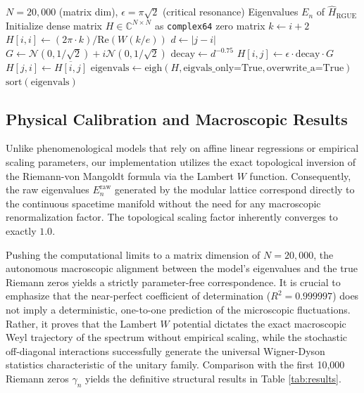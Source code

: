 \documentclass[aps,prl,preprint,superscriptaddress,floatfix]{revtex4-2}
\begin{document}
\begin{algorithm}[H]
\caption{Parameter-Free Riemann-GUE Ensemble Generation}
\label{alg:hamiltonian}
\begin{algorithmic}
\Require $N=20,000$ (matrix dim), $\epsilon=\pi\sqrt{2}$ (critical resonance)
\Ensure Eigenvalues $E_n$ of $\hat{H}_{\text{RGUE}}$
\State Initialize dense matrix $H \in \mathbb{C}^{N \times N}$ as \texttt{complex64} zero matrix
    \State $k \gets i+2$
    \State $H[i,i] \gets (2\pi \cdot k) / \text{Re}(W(k/e))$ 
        \State $d \gets |j-i|$
         
            \State $G \gets \mathcal{N}(0, 1/\sqrt{2}) + i\mathcal{N}(0, 1/\sqrt{2})$ 
            \State $\text{decay} \gets d^{-0.75}$ 
            \State $H[i,j] \gets \epsilon \cdot \text{decay} \cdot G$
            \State $H[j,i] \gets \overline{H[i,j]}$ 
        \EndIf
    \EndFor
\EndFor
\State $\text{eigenvals} \gets \text{eigh}(H, \text{eigvals\_only=True}, \text{overwrite\_a=True})$
\State \Return $\text{sort}(\text{eigenvals})$
\end{algorithmic}
\end{algorithm}

\subsection{Physical Calibration and Macroscopic Results}
Unlike phenomenological models that rely on affine linear regressions or empirical scaling parameters, our implementation utilizes the exact topological inversion of the Riemann-von Mangoldt formula via the Lambert $W$ function. Consequently, the raw eigenvalues $E_n^{\text{raw}}$ generated by the modular lattice correspond directly to the continuous spacetime manifold without the need for any macroscopic renormalization factor. The topological scaling factor inherently converges to exactly $1.0$.

Pushing the computational limits to a matrix dimension of $N=20,000$, the autonomous macroscopic alignment between the model's eigenvalues and the true Riemann zeros yields a strictly parameter-free correspondence. It is crucial to emphasize that the near-perfect coefficient of determination ($R^2 = 0.999997$) does not imply a deterministic, one-to-one prediction of the microscopic fluctuations. Rather, it proves that the Lambert $W$ potential dictates the exact macroscopic Weyl trajectory of the spectrum without empirical scaling, while the stochastic off-diagonal interactions successfully generate the universal Wigner-Dyson statistics characteristic of the unitary family. Comparison with the first 10,000 Riemann zeros $\gamma_n$ yields the definitive structural results in Table \ref{tab:results}.
\end{document}
